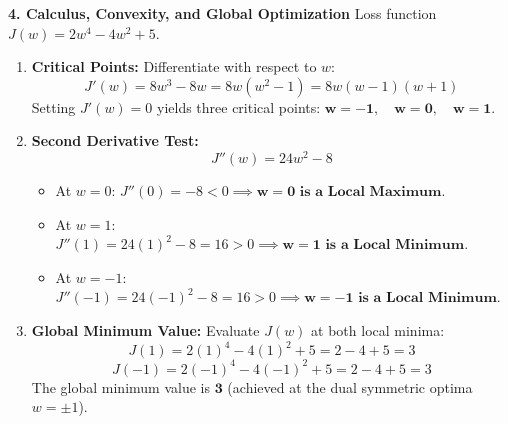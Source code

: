 \textbf{4. Calculus, Convexity, and Global Optimization}
Loss function $J(w) = 2w^4 - 4w^2 + 5$.
\begin{enumerate}
    \item \textbf{Critical Points:} Differentiate with respect to $w$:
    \begin{equation*}
    J'(w) = 8w^3 - 8w = 8w(w^2 - 1) = 8w(w - 1)(w + 1)
    \end{equation*}
    Setting $J'(w) = 0$ yields three critical points: $\mathbf{w = -1, \quad w = 0, \quad w = 1}$.
    \item \textbf{Second Derivative Test:}
    \begin{equation*}
    J''(w) = 24w^2 - 8
    \end{equation*}
    \begin{itemize}
        \item At $w = 0$: $J''(0) = -8 < 0 \implies \mathbf{w = 0 \text{ is a Local Maximum}}$.
        \item At $w = 1$: $J''(1) = 24(1)^2 - 8 = 16 > 0 \implies \mathbf{w = 1 \text{ is a Local Minimum}}$.
        \item At $w = -1$: $J''(-1) = 24(-1)^2 - 8 = 16 > 0 \implies \mathbf{w = -1 \text{ is a Local Minimum}}$.
    \end{itemize}
    \item \textbf{Global Minimum Value:}
    Evaluate $J(w)$ at both local minima:
    \begin{equation*}
    J(1) = 2(1)^4 - 4(1)^2 + 5 = 2 - 4 + 5 = 3
    \end{equation*}
    \begin{equation*}
    J(-1) = 2(-1)^4 - 4(-1)^2 + 5 = 2 - 4 + 5 = 3
    \end{equation*}
    The global minimum value is $\mathbf{3}$ (achieved at the dual symmetric optima $w = \pm 1$).
\end{enumerate}

